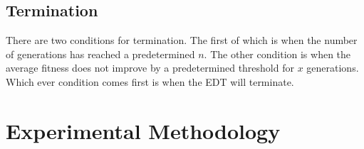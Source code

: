 \documentclass[12pt]{article}
\begin{document}
\subsection{Termination}

There are two conditions for termination. The first of which is when the number of generations has reached a predetermined $n$. The other condition is when the average fitness does not improve by a predetermined threshold for $x$ generations. Which ever condition comes first is when the EDT will terminate.

\section{Experimental Methodology}




\end{document}
